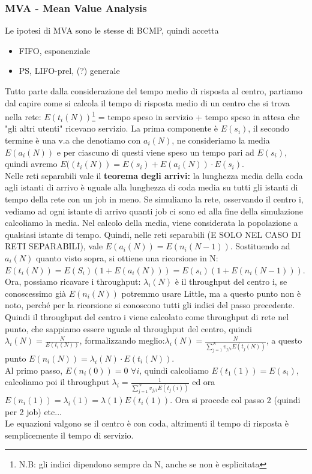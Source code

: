 \documentclass{article}
\begin{document}
\subsubsection{MVA - Mean Value Analysis}
Le ipotesi di MVA sono le stesse di BCMP, quindi accetta
\begin{itemize}
\item FIFO, esponenziale
\item PS, LIFO-prel, (?) generale
\end{itemize}
Tutto parte dalla considerazione del tempo medio di risposta al centro, partiamo dal capire come si calcola il tempo di risposta medio di un centro che si trova nella rete: $E(t_i(N))$\footnote{N.B: gli indici dipendono sempre da N, anche se non è esplicitata} = tempo speso in servizio + tempo speso in attesa che "gli altri utenti" ricevano servizio. La prima componente è $E(s_i)$, il secondo termine è una v.a che denotiamo con $a_i(N)$, ne consideriamo la media $E(a_i(N))$ e per ciascuno di questi viene speso un tempo pari ad $E(s_i)$, quindi avremo $E((t_i(N)) = E(s_i) + E(a_i(N))\cdot E(s_i)$.\\ Nelle reti separabili vale il \textbf{teorema degli arrivi: }la lunghezza media della coda agli istanti di arrivo è uguale alla lunghezza di coda media su tutti gli istanti di tempo della rete con un job in meno. Se simuliamo la rete, osservando il centro i, vediamo ad ogni istante di arrivo quanti job ci sono ed alla fine della simulazione calcoliamo la media. Nel calcolo della media, viene considerata la popolazione a qualsiasi istante di tempo. Quindi, nelle reti separabili (E SOLO NEL CASO DI RETI SEPARABILI), vale $E(a_i(N)) = E(n_i(N-1))$. Sostituendo ad $a_i(N)$ quanto visto sopra, si ottiene una ricorsione in N: $E(t_i(N)) = E(S_i)(1 + E(a_i(N))) = E(s_i)(1 + E(n_i(N-1)))$.\\ Ora, possiamo ricavare i throughput: $\lambda_i(N)$ è il throughput del centro i, se conoscessimo già $E(n_i(N))$ potremmo usare Little, ma a questo punto non è noto, perché per la ricorsione si conoscono tutti gli indici del passo precedente.\\ Quindi il throughput del centro i viene calcolato come throughput di rete nel punto, che sappiamo essere uguale al throughput del centro, quindi $\lambda_i(N) = \frac{N}{E(t_i(N))}$, formalizzando meglio:$\lambda_i(N) = \frac{N}{\sum\limits_{j=1}^{N} v_{j/i}E(t_j(N))}$, a questo punto $E(n_i(N)) = \lambda_i(N)\cdot E(t_i(N))$.\\ Al primo passo, $E(n_i(0)) = 0$ $\forall i$, quindi calcoliamo $E(t_1(1)) = E(s_i)$, calcoliamo poi il throughput $\lambda_i = \frac{1}{\sum\limits_{j=1}^{N} v_{j/i}E(t_j(i))}$ ed ora $E(n_i(1)) = \lambda_i(1) = \lambda(1)E(t_i(1))$. Ora si procede col passo 2 (quindi per 2 job) etc...\\ Le equazioni valgono se il centro è con coda, altrimenti il tempo di risposta è semplicemente il tempo di servizio.
\end{document}
